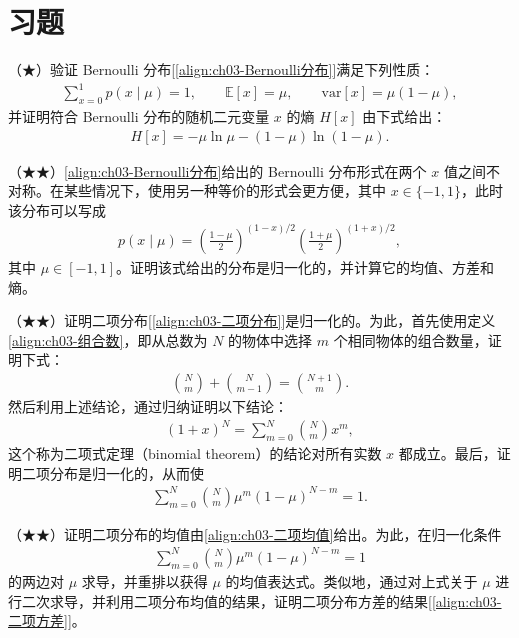\documentclass[../../main.tex]{subfiles}
\begin{document}
\section{习题}\label{section:ch03-习题}

\begin{exercise}\label{exercise:ch03-01}
（★）验证 Bernoulli 分布[\eqref{align:ch03-Bernoulli分布}]满足下列性质：
\begin{align*}
\sum_{x=0}^{1}p(x\mid\mu)=1,\qquad \mathbb{E}[x]=\mu,\qquad \mathrm{var}[x]=\mu(1-\mu),
\end{align*}
并证明符合 Bernoulli 分布的随机二元变量 $x$ 的熵 $H[x]$ 由下式给出：
\begin{align*}
H[x]=-\mu\ln\mu-(1-\mu)\ln(1-\mu).
\end{align*}
\end{exercise}

\begin{exercise}\label{exercise:ch03-02}
（★★）\eqref{align:ch03-Bernoulli分布}给出的 Bernoulli 分布形式在两个 $x$ 值之间不对称。在某些情况下，使用另一种等价的形式会更方便，其中 $x\in\{-1,1\}$，此时该分布可以写成
\begin{align*}
p(x\mid\mu)=\left(\frac{1-\mu}{2}\right)^{(1-x)/2}\left(\frac{1+\mu}{2}\right)^{(1+x)/2},
\end{align*}
其中 $\mu\in[-1,1]$。证明该式给出的分布是归一化的，并计算它的均值、方差和熵。
\end{exercise}

\begin{exercise}\label{exercise:ch03-03}
（★★）证明二项分布[\eqref{align:ch03-二项分布}]是归一化的。为此，首先使用定义\eqref{align:ch03-组合数}，即从总数为 $N$ 的物体中选择 $m$ 个相同物体的组合数量，证明下式：
\begin{align*}
\binom{N}{m}+\binom{N}{m-1}=\binom{N+1}{m}.
\end{align*}
然后利用上述结论，通过归纳证明以下结论：
\begin{align*}
(1+x)^{N}=\sum_{m=0}^{N}\binom{N}{m}x^{m},
\end{align*}
这个称为二项式定理（binomial theorem）的结论对所有实数 $x$ 都成立。最后，证明二项分布是归一化的，从而使
\begin{align*}
\sum_{m=0}^{N}\binom{N}{m}\mu^{m}(1-\mu)^{N-m}=1.
\end{align*}
\end{exercise}

\begin{exercise}\label{exercise:ch03-04}
（★★）证明二项分布的均值由\eqref{align:ch03-二项均值}给出。为此，在归一化条件
\begin{align*}
\sum_{m=0}^{N}\binom{N}{m}\mu^{m}(1-\mu)^{N-m}=1
\end{align*}
的两边对 $\mu$ 求导，并重排以获得 $\mu$ 的均值表达式。类似地，通过对上式关于 $\mu$ 进行二次求导，并利用二项分布均值的结果，证明二项分布方差的结果[\eqref{align:ch03-二项方差}]。
\end{exercise}
\end{document}

